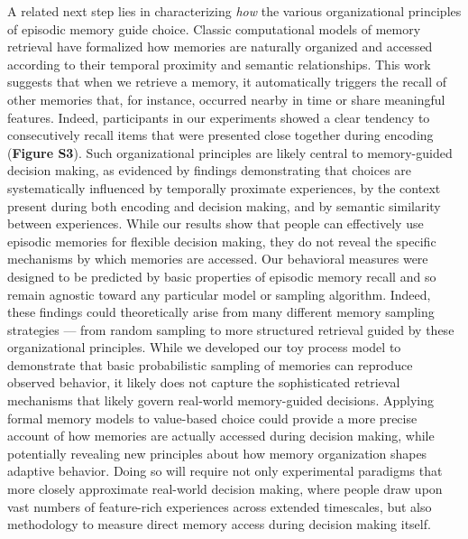 \documentclass[10pt,letterpaper]{article}
\begin{document}
A related next step lies in characterizing \textit{how} the various organizational principles of episodic memory guide choice. Classic computational models of memory retrieval have formalized how memories are naturally organized and accessed according to their temporal proximity and semantic relationships\cite{howardDistributedRepresentationTemporal2002, polynContextMaintenanceRetrieval2009, kahanaComputationalModelsMemory2020}. This work suggests that when we retrieve a memory, it automatically triggers the recall of other memories that, for instance, occurred nearby in time or share meaningful features. Indeed, participants in our experiments showed a clear tendency to consecutively recall items that were presented close together during encoding (\textbf{Figure S3}). Such organizational principles are likely central to memory-guided decision making, as evidenced by findings demonstrating that choices are systematically influenced by temporally proximate experiences\cite{bornsteinRemindersChoicesBias2017}, by the context present during both encoding\cite{duncanModulatingUseMultiple2019} and decision making\cite{bornsteinReinstatedEpisodicContext2017,duncanModulatingUseMultiple2019}, and by semantic similarity between experiences\cite{plonskyRelianceSmallSamples2015, akaWhatWhatRemember2021}. While our results show that people can effectively use episodic memories for flexible decision making, they do not reveal the specific mechanisms by which memories are accessed. Our behavioral measures were designed to be predicted by basic properties of episodic memory recall and so remain agnostic toward any particular model or sampling algorithm. Indeed, these findings could theoretically arise from many different memory sampling strategies --- from random sampling to more structured retrieval guided by these organizational principles. While we developed our toy process model to demonstrate that basic probabilistic sampling of memories can reproduce observed behavior, it likely does not capture the sophisticated retrieval mechanisms that likely govern real-world memory-guided decisions. Applying formal memory models to value-based choice could provide a more precise account of how memories are actually accessed during decision making, while potentially revealing new principles about how memory organization shapes adaptive behavior. Doing so will require not only experimental paradigms that more closely approximate real-world decision making, where people draw upon vast numbers of feature-rich experiences across extended timescales, but also methodology to measure direct memory access during decision making itself.
\end{document}
